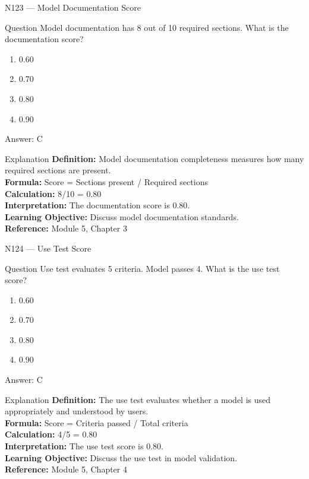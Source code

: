 \documentclass[aspectratio=169,8pt]{beamer}
\begin{document}
	\begin{frame}{N123 --- Model Documentation Score}
		\begin{block}{Question}
			Model documentation has 8 out of 10 required sections. What is the documentation score?
			\begin{enumerate}
				\item 0.60
				\item 0.70
				\item 0.80
				\item 0.90
			\end{enumerate}
		\end{block}
		\begin{exampleblock}{Answer: C}\end{exampleblock}
		\begin{block}{Explanation}
			\textbf{Definition:} Model documentation completeness measures how many required sections are present.\\
			\textbf{Formula:} Score = Sections present / Required sections\\
			\textbf{Calculation:} 8/10 = 0.80\\
			\textbf{Interpretation:} The documentation score is 0.80.\\
			\textbf{Learning Objective:} Discuss model documentation standards.\\
			\textbf{Reference:} Module 5, Chapter 3
		\end{block}
	\end{frame}
	
	\begin{frame}{N124 --- Use Test Score}
		\begin{block}{Question}
			Use test evaluates 5 criteria. Model passes 4. What is the use test score?
			\begin{enumerate}
				\item 0.60
				\item 0.70
				\item 0.80
				\item 0.90
			\end{enumerate}
		\end{block}
		\begin{exampleblock}{Answer: C}\end{exampleblock}
		\begin{block}{Explanation}
			\textbf{Definition:} The use test evaluates whether a model is used appropriately and understood by users.\\
			\textbf{Formula:} Score = Criteria passed / Total criteria\\
			\textbf{Calculation:} 4/5 = 0.80\\
			\textbf{Interpretation:} The use test score is 0.80.\\
			\textbf{Learning Objective:} Discuss the use test in model validation.\\
			\textbf{Reference:} Module 5, Chapter 4
		\end{block}
	\end{frame}
	
\end{document}
